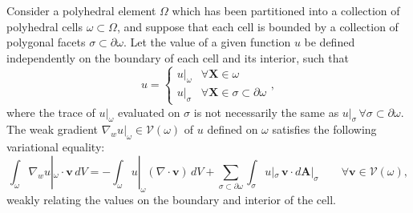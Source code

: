 \documentclass[10pt,a4paper]{article}
\begin{document}
Consider a polyhedral element $\Omega$ which has been partitioned into a collection of polyhedral cells $\omega \subset \Omega$, and suppose that each cell is bounded by a collection of polygonal facets $\sigma \subset \partial \omega$. Let the value of a given function $u$ be defined independently on the boundary of each cell and its interior, such that
\begin{equation}
  u = \left\{ \begin{array}{cc} u |_{\omega} & \forall \mathbf{X} \in \omega \\ u |_{\sigma} & \forall \mathbf{X} \in \sigma \subset \partial \omega \end{array} \right. ,
\end{equation}
where the trace of $u |_{\omega}$ evaluated on $\sigma$ is not necessarily the same as $u |_{\sigma} \, \forall \sigma \subset \partial \omega$.
The weak gradient $\nabla_w u |_{\omega} \in \mathcal{V} (\omega)$ of $u$ defined on $\omega$ satisfies the following variational equality:
\begin{equation}
  \int_{\omega} \nabla_w u |_{\omega} \cdot \mathbf{v} \, dV = - \int_{\omega} u |_{\omega} (\nabla \cdot \mathbf{v}) \, dV + \sum_{\sigma \subset \partial \omega} \int_{\sigma} u |_{\sigma} \, \mathbf{v} \cdot d\mathbf{A} |_\sigma \qquad \forall \mathbf{v} \in \mathcal{V} (\omega),
\end{equation}
weakly relating the values on the boundary and interior of the cell.
\end{document}
